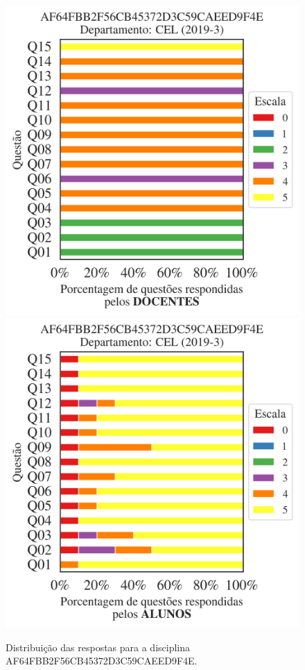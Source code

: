 \documentclass[a4paper,10pt]{article}
\begin{document}
\begin{figure}[h]
\centering
\includegraphics[width=0.485\linewidth]{analise_disciplina_departamento_CEL_AF64FBB2F56CB45372D3C59CAEED9F4E_docentes.png}
\includegraphics[width=0.485\linewidth]{analise_disciplina_departamento_CEL_AF64FBB2F56CB45372D3C59CAEED9F4E_alunos.png}
\caption{\label{fig:analise_geral_departamento}                Distribuição das respostas para a disciplina AF64FBB2F56CB45372D3C59CAEED9F4E. }
\end{figure}
\end{document}
